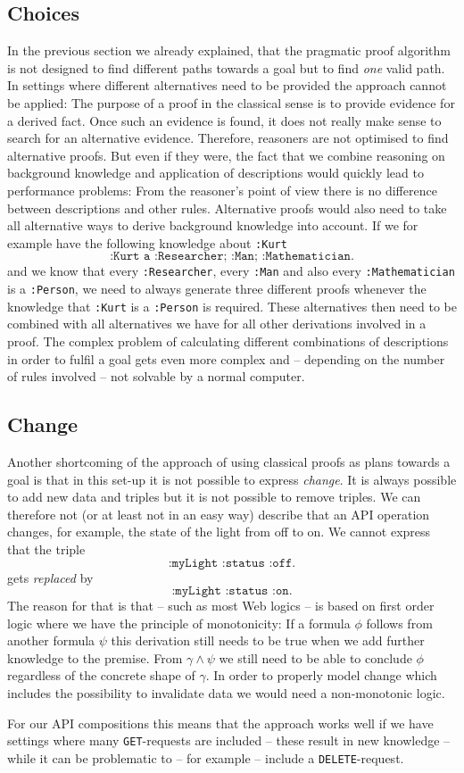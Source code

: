 \subsection{Choices}
In the previous section we already explained, that the pragmatic proof algorithm is not designed to find different paths towards a goal but to find \emph{one} valid path.
In settings where different alternatives need to be provided the approach cannot be applied: 
The purpose of a proof in the classical sense is to provide evidence for a derived fact. 
Once such an evidence is found, 
it does not really make sense to search for an alternative 
evidence. Therefore, \nthree reasoners are not optimised to find alternative proofs. But even if they were,
the fact that we
combine reasoning on background knowledge and application 
of \restdesc descriptions would quickly lead to performance problems:
From the reasoner's point of view there is no difference between \restdesc descriptions and other rules. Alternative proofs would also need to take all alternative 
ways to derive background knowledge into account.  If we for example have the following knowledge about \texttt{:Kurt}
\[
\texttt{:Kurt a :Researcher; :Man; :Mathematician.}
\]
and we know that every \texttt{:Researcher}, every \texttt{:Man} and also every \texttt{:Mathematician} is a \texttt{:Person}, we need to always generate three different 
proofs whenever the knowledge that \texttt{:Kurt} is a \texttt{:Person} is required. 
These alternatives then need to be combined with all alternatives we have for all other derivations involved in a proof.
The complex problem of calculating different combinations of \restdesc descriptions in order to fulfil a goal gets
even more complex and -- depending on the number of rules involved -- not solvable by a normal computer.



\subsection{Change}
Another shortcoming of the approach of using classical proofs as plans towards a goal is that in this set-up it is not possible to express \emph{change}. It is
always possible to add new data and triples but it is not possible to remove triples. 
We can therefore not (or at least not in an easy way) describe that an API operation changes, for example, the state of the light from off to on. 
We cannot express that  the triple
\[
\texttt{:myLight :status :off.}
\]
gets \emph{replaced} by
\[
\texttt{:myLight :status :on.}
\]
The reason for that is that \nthreelogic -- such as most Web logics -- is based on first order logic where we have the principle of monotonicity: 
If a formula $\phi$ follows from 
another formula $\psi$ this derivation still needs to be true when we add further knowledge to the premise. From $\gamma\wedge\psi$ we still need to be able to conclude 
$\phi$ regardless of the concrete shape of $\gamma$. In order to properly model change which includes the possibility to invalidate data we would 
need a non-monotonic logic.

For our API compositions this means that the approach works well if we have settings where many \texttt{GET}-requests are included -- these result in new knowledge -- 
while it can be problematic to -- for example -- include a \texttt{DELETE}-request.

